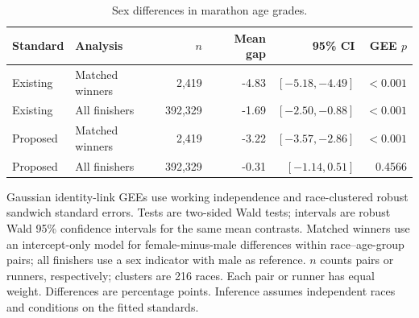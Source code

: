 \documentclass[11pt]{article}
\begin{document}
\clearpage
\begin{table}[htbp]
\centering
\small
\caption{Sex differences in marathon age grades.}
\label{tab:marathon-test-table}
\setlength{\tabcolsep}{4pt}
\begin{tabular}{llrrrr}
\toprule
Standard & Analysis & $n$ & Mean gap & 95\% CI & GEE $p$ \\
\midrule
Existing & Matched winners & 2,419 & -4.83 & $[-5.18, -4.49]$ & $<0.001$ \\
Existing & All finishers & 392,329 & -1.69 & $[-2.50, -0.88]$ & $<0.001$ \\
Proposed & Matched winners & 2,419 & -3.22 & $[-3.57, -2.86]$ & $<0.001$ \\
Proposed & All finishers & 392,329 & -0.31 & $[-1.14, 0.51]$ & 0.4566 \\
\bottomrule
\end{tabular}
\par\medskip
\begin{minipage}{\textwidth}
\footnotesize
Gaussian identity-link GEEs use working independence and race-clustered robust sandwich standard errors. Tests are two-sided Wald tests; intervals are robust Wald 95\% confidence intervals for the same mean contrasts. Matched winners use an intercept-only model for female-minus-male differences within race--age-group pairs; all finishers use a sex indicator with male as reference. $n$ counts pairs or runners, respectively; clusters are 216 races. Each pair or runner has equal weight. Differences are percentage points. Inference assumes independent races and conditions on the fitted standards.
\end{minipage}
\end{table}
\end{document}
